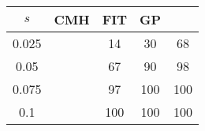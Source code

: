\centering \begin{tabular}{c|c|c|c|c}
$s$	&CMH	&FIT	&GP	&\sc{Clear}\\\hline
0.025	&	&14	&30	&68\\
0.05	&	&67	&90	&98\\
0.075	&	&97	&100	&100\\
0.1	&	&100	&100	&100\\
\end{tabular}
